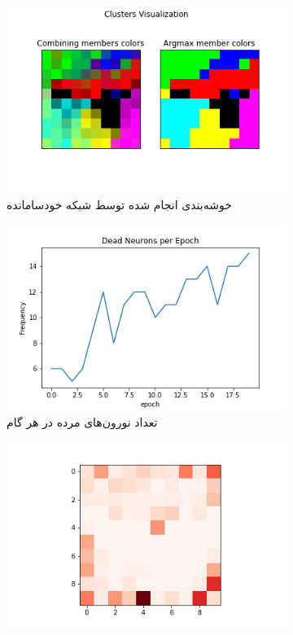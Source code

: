 \documentclass[12pt, a4paper]{article}
\begin{document}
\clearpage

\begin{figure}[h]
    \begin{subfigure}{\linewidth}
        \centering
        \includegraphics[width=0.8\linewidth]{images/q5/r13/cluster.png}
        \caption{خوشه‌بندی انجام شده توسط شبکه خودسامانده}
    \end{subfigure}
    \newline
    \begin{subfigure}{0.45\linewidth}
        \includegraphics[width=\linewidth]{images/q5/r13/dead.png}
        \caption{تعداد نورون‌های مرده در هر گام}
    \end{subfigure}
    \hfill
    \begin{subfigure}{0.45\linewidth}
        \includegraphics[width=\linewidth]{images/q5/r13/umatrix.png}

\end{subfigure}
\end{figure}
\end{document}
